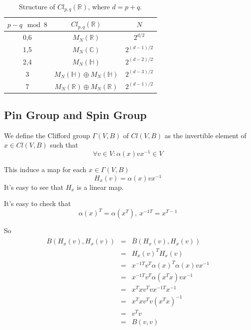 \documentclass[12pt]{book}
\begin{document}
	\begin{table}[htb!]
	\centering
	\begin{tabular}{|c|c|c|}
		\hline
		$p-q \mod 8$&$Cl_{p,q}(\mathbb R)$&$N$\\\hline
		0,6&$M_N(\mathbb R)$&$2^{d/2}$\\\hline
		1,5&$M_N(\mathbb C)$&$2^{(d-1)/2}$\\\hline
		2,4&$M_N(\mathbb H)$&$2^{(d-2)/2}$\\\hline
		3&$M_N(\mathbb H)\oplus M_N(\mathbb H)$&$2^{(d-3)/2}$\\\hline
		7&$M_N(\mathbb R)\oplus M_N(\mathbb R)$&$2^{(d-1)/2}$\\\hline
	\end{tabular}
	\caption{Structure of $Cl_{p,q}(\mathbb R)$, where $d=p+q$.}
	\label{tab:clifford}
	\end{table}
	
	

	\subsection{Pin Group and Spin Group}
	
	We define the Clifford group $\Gamma(V,B)$ of $Cl(V,B)$ as the invertible element of $x\in Cl(V,B)$ such that
	\begin{equation}
		\forall v \in V: \alpha(x)vx^{-1}\in V
	\end{equation}
	
	This induce a map for each $x\in \Gamma(V,B)$
	\begin{equation}
		H_x(v) = \alpha(x)vx^{-1}
	\end{equation}
	It's easy to see that $H_x$ is a linear map.
	
	It's easy to check that
	\begin{equation}
		\alpha(x)^T=\alpha(x^T),\ x^{-1T}=x^{T-1}
	\end{equation}
	
	So
	\begin{eqnarray}
		B(H_x(v),H_x(v))&=&\bar B(H_x(v),H_x(v))\\
		&=&H_x(v)^TH_x(v)\\
		&=&x^{-1T}v^T\alpha(x)^T\alpha(x)vx^{-1}\\
		&=&x^{-1T}v^T\alpha(x^Tx)vx^{-1}\\
		&=&x^Tx v^Tv x^{-1T}x^{-1}\\
		&=&x^Tx v^Tv (x^{T}x)^{-1}\\
		&=&v^Tv\\
		&=&B(v,v)
	\end{eqnarray}
	
\end{document}
